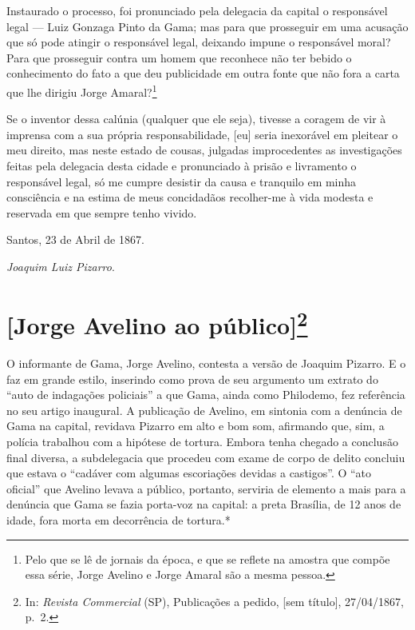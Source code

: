 Instaurado o processo, foi pronunciado pela delegacia da capital o
responsável legal --- Luiz Gonzaga Pinto da Gama; mas para que
prosseguir em uma acusação que só pode atingir o responsável legal,
deixando impune o responsável moral? Para que prosseguir contra um homem
que reconhece não ter bebido o conhecimento do fato a que deu
publicidade em outra fonte que não fora a carta que lhe dirigiu Jorge
Amaral?\footnote{ Pelo que se lê de jornais da época, e que se
  reflete na amostra que compõe essa série, Jorge Avelino e Jorge Amaral
  são a mesma pessoa.}

Se o inventor dessa calúnia (qualquer que ele seja), tivesse a coragem
de vir à imprensa com a sua própria responsabilidade, {[}eu{]} seria
inexorável em pleitear o meu direito, mas neste estado de cousas,
julgadas improcedentes as investigações feitas pela delegacia desta
cidade e pronunciado à prisão e livramento o responsável legal, só me
cumpre desistir da causa e tranquilo em minha consciência e na estima de
meus concidadãos recolher-me à vida modesta e reservada em que sempre
tenho vivido.

Santos, 23 de Abril de 1867.

\emph{Joaquim Luiz Pizarro}.

\chapter{{[}Jorge Avelino ao público{]}\footnote{In: 
\emph{Revista Commercial} (SP), Publicações a pedido, {[}sem título{]}, 
27/04/1867, p.~2.}}

\begin{didascalia}
O informante de Gama, Jorge Avelino, contesta a versão de Joaquim
Pizarro. E o faz em grande estilo, inserindo como prova de seu argumento
um extrato do ``auto de indagações policiais'' a que Gama, ainda como
Philodemo, fez referência no seu artigo inaugural. A publicação de
Avelino, em sintonia com a denúncia de Gama na capital, revidava Pizarro
em alto e bom som, afirmando que, sim, a polícia trabalhou com a
hipótese de tortura. Embora tenha chegado a conclusão final diversa, a
subdelegacia que procedeu com exame de corpo de delito concluiu que
estava o ``cadáver com algumas escoriações devidas a castigos''. O ``ato
oficial'' que Avelino levava a público, portanto, serviria de elemento a
mais para a denúncia que Gama se fazia porta-voz na capital: a preta
Brasília, de 12 anos de idade, fora morta em decorrência de tortura.*
\end{didascalia}

